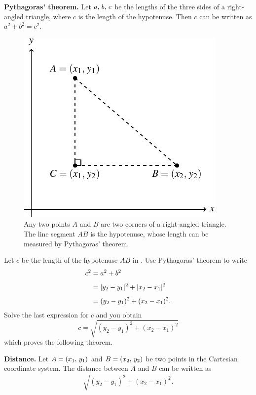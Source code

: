 \documentclass[a4paper,oneside,12pt]{article}
\begin{document}
\begin{theorem}
\textbf{Pythagoras' theorem.}
Let ${a},\, {b},\, {c}$ be the lengths of the three sides of a
right-angled triangle, where $c$ is the length of the hypotenuse.
Then $c$ can be written as $a^2 + b^2 = c^2$.
\end{theorem}

\begin{figure}[!htbp]
\centering
\includegraphics[scale=1.1]{image/03/distance-two-points.pdf}
\caption{%
  Any two points $A$ and $B$ are two corners of a right-angled
  triangle.  The line segment $AB$ is the hypotenuse, whose length can
  be measured by Pythagoras' theorem.
}
\label{fig:distance_between_two_points}
\end{figure}

Let $c$ be the length of the hypotenuse $AB$ in
.  Use Pythagoras' theorem to
write
\begin{align*}
c^2
&=
a^2 + b^2 \\[4pt]
&=
\lvert y_2 - y_1\rvert^2 + \lvert x_2 - x_1\rvert^2 \\[4pt]
&=
(y_2 - y_1)^2 + (x_2 - x_1)^2.
\end{align*}
Solve the last expression for $c$ and you obtain
\[
c
=
\sqrt{
  (y_2 - y_1)^2
  +
  (x_2 - x_1)^2
}
\]
which proves the following theorem.

\begin{theorem}
\label{thm:distance_between_two_points}
\textbf{Distance.}
Let $A = \left\lparen{x_1},\, {y_1}\right\rparen$ and $B = \left\lparen{x_2},\, {y_2}\right\rparen$ be two points in
the Cartesian coordinate system.  The distance between $A$ and $B$ can
be written as
\[
\sqrt{
  (y_2 - y_1)^2
  +
  (x_2 - x_1)^2
}.
\]
\end{theorem}
\end{document}
